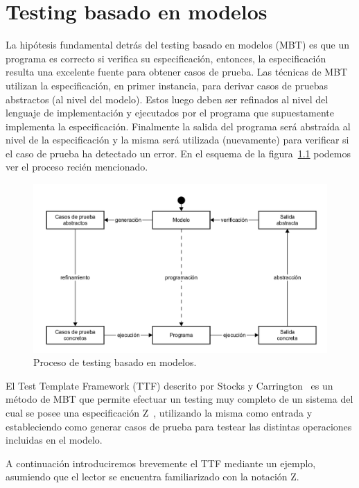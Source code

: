 \chapter{Testing basado en modelos}

La hipótesis fundamental detrás del testing basado en modelos (MBT) es que un programa es correcto si verifica su especificación, entonces, la especificación resulta una excelente fuente para obtener casos de prueba. Las técnicas de MBT utilizan la especificación, en primer instancia, para derivar casos de pruebas abstractos (al nivel del modelo). Estos luego deben ser refinados al nivel del lenguaje de implementación y ejecutados por el programa que supuestamente implementa la especificación. Finalmente la salida del programa será abstraída al nivel de la especificación y la misma será utilizada (nuevamente) para verificar si el caso de prueba ha detectado un error. En el esquema de la figura~\ref{fig:proc_mbt} podemos ver el proceso recién mencionado.

\begin{figure}[H]
\begin{center}
\includegraphics[scale=0.25]{img/proc_mbt.png}
\caption{Proceso de testing basado en modelos.}
\label{fig:proc_mbt}
\end{center}
\end{figure}


El Test Template Framework (TTF) descrito por Stocks y Carrington~\cite{stocks} es un método de MBT que permite efectuar un testing muy completo de un sistema del cual se posee una especificación Z~\cite{spivey}, utilizando la misma como entrada y estableciendo como generar casos de prueba para testear las distintas operaciones incluidas en el modelo.

A continuación introduciremos brevemente el TTF mediante un ejemplo, asumiendo que el lector se encuentra familiarizado con la notación Z.

